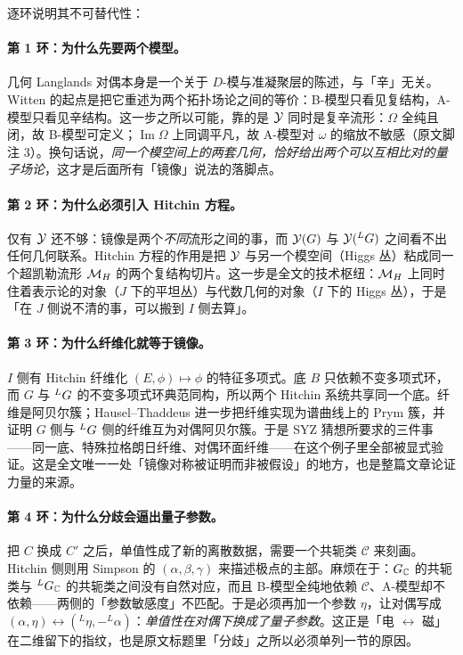 逐环说明其不可替代性：

\paragraph{第 1 环：为什么先要两个模型。}
几何 Langlands 对偶本身是一个关于 $D$-模与准凝聚层的陈述，与「辛」无关。Witten 的起点是把它重述为两个拓扑场论之间的等价：B-模型只看见复结构，A-模型只看见辛结构。这一步之所以可能，靠的是 $\mathcal{Y}$ 同时是复辛流形：$\Omega$ 全纯且闭，故 B-模型可定义；$\operatorname{Im}\Omega$ 上同调平凡，故 A-模型对 $\omega$ 的缩放不敏感（原文脚注 3）。换句话说，\emph{同一个模空间上的两套几何，恰好给出两个可以互相比对的量子场论}，这才是后面所有「镜像」说法的落脚点。

\paragraph{第 2 环：为什么必须引入 Hitchin 方程。}
仅有 $\mathcal{Y}$ 还不够：镜像是两个\emph{不同}流形之间的事，而 $\mathcal{Y}(G)$ 与 $\mathcal{Y}({}^{L}G)$ 之间看不出任何几何联系。Hitchin 方程的作用是把 $\mathcal{Y}$ 与另一个模空间（Higgs 丛）粘成同一个超凯勒流形 $\mathcal{M}_{H}$ 的两个复结构切片。这一步是全文的技术枢纽：$\mathcal{M}_{H}$ 上同时住着表示论的对象（$J$ 下的平坦丛）与代数几何的对象（$I$ 下的 Higgs 丛），于是「在 $J$ 侧说不清的事，可以搬到 $I$ 侧去算」。

\paragraph{第 3 环：为什么纤维化就等于镜像。}
$I$ 侧有 Hitchin 纤维化 $(E,\phi)\mapsto\phi$ 的特征多项式\cite{Hitchin1987b}。底 $B$ 只依赖不变多项式环，而 $G$ 与 ${}^{L}G$ 的不变多项式环典范同构，所以两个 Hitchin 系统共享同一个底。纤维是阿贝尔簇；Hausel--Thaddeus 进一步把纤维实现为谱曲线上的 Prym 簇，并证明 $G$ 侧与 ${}^{L}G$ 侧的纤维互为对偶阿贝尔簇\cite{HauselThaddeus2002}。于是 SYZ 猜想所要求的三件事——同一底、特殊拉格朗日纤维、对偶环面纤维——在这个例子里全部被显式验证。这是全文唯一一处「镜像对称被证明而非被假设」的地方，也是整篇文章论证力量的来源。

\paragraph{第 4 环：为什么分歧会逼出量子参数。}
把 $C$ 换成 $C'$ 之后，单值性成了新的离散数据，需要一个共轭类 $\mathcal{C}$ 来刻画。Hitchin 侧则用 Simpson 的 $(\alpha,\beta,\gamma)$ 来描述极点的主部\cite{Simpson1990}。麻烦在于：$G_{\mathbb{C}}$ 的共轭类与 ${}^{L}G_{\mathbb{C}}$ 的共轭类之间没有自然对应，而且 B-模型全纯地依赖 $\mathcal{C}$、A-模型却不依赖——两侧的「参数敏感度」不匹配。于是必须再加一个参数 $\eta$，让对偶写成 $(\alpha,\eta)\leftrightarrow({}^{L}\eta,-{}^{L}\alpha)$：\emph{单值性在对偶下换成了量子参数}。这正是「电 $\leftrightarrow$ 磁」在二维留下的指纹，也是原文标题里「分歧」之所以必须单列一节的原因。

